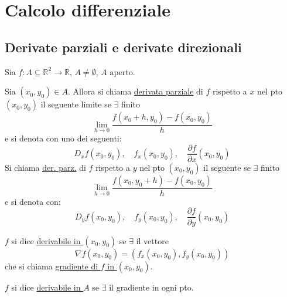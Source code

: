 
\section{Calcolo differenziale}

\subsection{Derivate parziali e derivate direzionali}

\begin{definition}
Sia $f : A \subseteq \mathbb{R}^2 \to \mathbb{R}$, $A \neq \emptyset$, $A$ aperto.

Sia $(x_0, y_0) \in A$. Allora si chiama \underline{derivata parziale} di $f$ rispetto a $x$ nel pto $(x_0, y_0)$ il seguente limite se $\exists$ finito
\[
\lim_{h \to 0} \frac{f(x_0 + h, y_0) - f(x_0, y_0)}{h}
\]
e si denota con uno dei seguenti:
\[
D_x f(x_0, y_0), \quad f_x(x_0, y_0), \quad \frac{\partial f}{\partial x}(x_0, y_0)
\]
Si chiama \underline{der. parz.} di $f$ rispetto a $y$ nel pto $(x_0, y_0)$ il seguente se $\exists$ finito
\[
\lim_{h \to 0} \frac{f(x_0, y_0 + h) - f(x_0, y_0)}{h}
\]
e si denota con:
\[
D_y f(x_0, y_0), \quad f_y(x_0, y_0), \quad \frac{\partial f}{\partial y}(x_0, y_0)
\]
\end{definition}

$f$ si dice \underline{derivabile in $(x_0, y_0)$} se $\exists$ il vettore
\[
\nabla f(x_0, y_0) = (f_x(x_0, y_0), f_y(x_0, y_0))
\]
 che si chiama \underline{gradiente di $f$ in $(x_0, y_0)$}.

$f$ si dice \underline{derivabile in $A$} se $\exists$ il gradiente in ogni pto.

